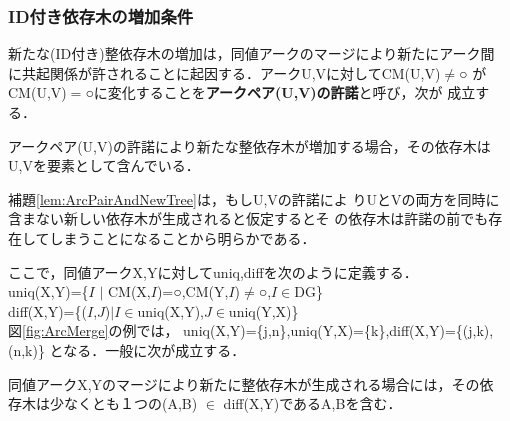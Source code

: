 \subsubsection{ID付き依存木の増加条件}\label{subsec:IDDTZoukaJuoken}

新たな(ID付き)整依存木の増加は，同値アークのマージにより新たにアーク間
に共起関係が許されることに起因する．アークU,Vに対してCM(U,V)${\neq}$○
がCM(U,V)$=$○に変化することを{\bf アークペア(U,V)の許諾}と呼び，次が
成立する．

\begin{lemma}[アークペアの許諾と整依存木の増加]
\label{lem:ArcPairAndNewTree}
アークペア(U,V)の許諾により新たな整依存木が増加する場合，その依存木は
U,Vを要素として含んでいる．
\end{lemma}

{\mynoindent}補題\ref{lem:ArcPairAndNewTree}は，もしU,Vの許諾によ
りUとVの両方を同時に含まない新しい依存木が生成されると仮定するとそ
の依存木は許諾の前でも存在してしまうことになることから明らかである．

\mygapskip
{\mynoindent}ここで，同値アークX,Yに対してuniq,diffを次のように定義する．\\
\hspace{8mm}uniq(X,Y)=\{$I$ ${\mid}$ CM(X,$I$)=○,CM(Y,$I$)${\neq}$○,$I{\in}$DG\}\\
\hspace{8mm}diff(X,Y)=\{($I$,$J$)${\mid}$$I{\in}$uniq(X,Y),$J{\in}$uniq(Y,X)\}\\ 
図\ref{fig:ArcMerge}の例では，
uniq(X,Y)=\{j,n\},uniq(Y,X)=\{k\},diff(X,Y)=\{(j,k),(n,k)\}
となる．一般に次が成立する．

\begin{lemma}[新規の整依存木の含むアーク]
\label{lem:ArcsInNewTree}

同値アークX,Yのマージにより新たに整依存木が生成される場合には，その依
存木は少なくとも１つの(A,B) $\in$ diff(X,Y)であるA,Bを含む．

\end{lemma}

